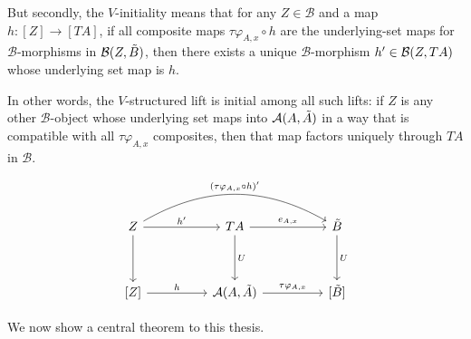 \documentclass[12pt,a4paper]{article}
\def\HomA{\ensuremath\mathcal{A}}
\def\HomB{\ensuremath\mathcal{B}}
\def\t{\ensuremath\tilde}
\begin{document}
But secondly,  the $V$-initiality means that for any $Z \in \mathcal{B}$ and a map $h: [Z] \to [TA]$, if  all composite maps $\tau \varphi_{A,x} \circ h$ are the underlying-set maps for $\mathcal{B}$-morphisms in $\HomB(Z, \t B)$, then there exists a unique $\mathcal{B}$-morphism $h' \in \HomB(Z, TA)$  whose underlying set map is $h$.

In other words, the $V$-structured lift is initial among all such lifts: if $Z$ is any other $\mathcal{B}$-object whose underlying set maps into $\HomA(A, \t A)$ in a way that is compatible with all $\tau \varphi_{A,x}$ composites, then that map factors uniquely through $TA$ in $\mathcal{B}$. 



\[\begin{tikzcd}
	Z && TA && {\t B} \\
	\\
	{[Z]} && {\HomA(A, \t A)} && {[\t B]}
	\arrow["h'", from=1-1, to=1-3]
	\arrow["{ ({\tau\varphi_{A,x}\circ h})'}", bend left, from=1-1, to=1-5]
	\arrow[from=1-1, to=3-1]
	\arrow["{e_{A,x}}", from=1-3, to=1-5]
	\arrow["U", from=1-3, to=3-3]
	\arrow["U", from=1-5, to=3-5]
	\arrow["h", from=3-1, to=3-3]
	\arrow["{\tau  \varphi_{A,x}}", from=3-3, to=3-5]
\end{tikzcd}\]


We now show a central theorem to this thesis.
\end{document}
